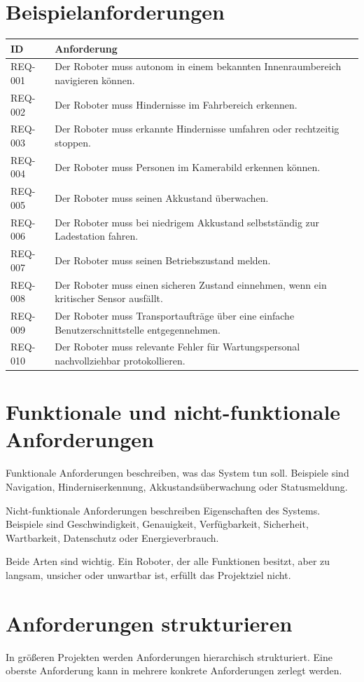 \section{Beispielanforderungen}
\begin{longtable}{p{}p{}}
\toprule
ID & Anforderung\\
\midrule
REQ-001 & Der Roboter muss autonom in einem bekannten Innenraumbereich navigieren können.\\
REQ-002 & Der Roboter muss Hindernisse im Fahrbereich erkennen.\\
REQ-003 & Der Roboter muss erkannte Hindernisse umfahren oder rechtzeitig stoppen.\\
REQ-004 & Der Roboter muss Personen im Kamerabild erkennen können.\\
REQ-005 & Der Roboter muss seinen Akkustand überwachen.\\
REQ-006 & Der Roboter muss bei niedrigem Akkustand selbstständig zur Ladestation fahren.\\
REQ-007 & Der Roboter muss seinen Betriebszustand melden.\\
REQ-008 & Der Roboter muss einen sicheren Zustand einnehmen, wenn ein kritischer Sensor ausfällt.\\
REQ-009 & Der Roboter muss Transportaufträge über eine einfache Benutzerschnittstelle entgegennehmen.\\
REQ-010 & Der Roboter muss relevante Fehler für Wartungspersonal nachvollziehbar protokollieren.\\
\bottomrule
\end{longtable}

\section{Funktionale und nicht-funktionale Anforderungen}
Funktionale Anforderungen beschreiben, was das System tun soll. Beispiele sind Navigation, Hinderniserkennung, Akkustandsüberwachung oder Statusmeldung.

Nicht-funktionale Anforderungen beschreiben Eigenschaften des Systems. Beispiele sind Geschwindigkeit, Genauigkeit, Verfügbarkeit, Sicherheit, Wartbarkeit, Datenschutz oder Energieverbrauch.

Beide Arten sind wichtig. Ein Roboter, der alle Funktionen besitzt, aber zu langsam, unsicher oder unwartbar ist, erfüllt das Projektziel nicht.

\section{Anforderungen strukturieren}
In größeren Projekten werden Anforderungen hierarchisch strukturiert. Eine oberste Anforderung kann in mehrere konkrete Anforderungen zerlegt werden.

